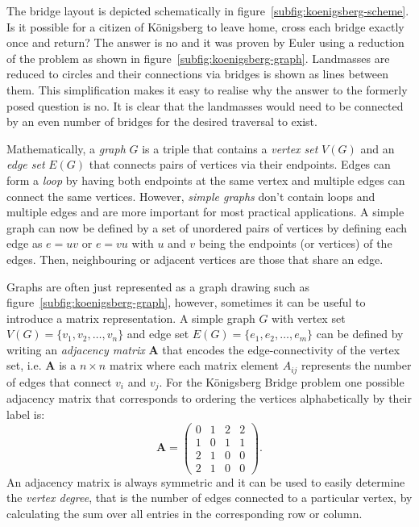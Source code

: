 %
The bridge layout is depicted schematically in
figure~\ref{subfig:koenigsberg-scheme}. Is it possible for a citizen of
K\"onigsberg to leave home, cross each bridge exactly once and return? The
answer is no and it was proven by Euler using a reduction of the problem as
shown in figure~\ref{subfig:koenigsberg-graph}. Landmasses are reduced to
circles and their connections via bridges is shown as lines between them. This
simplification makes it easy to realise why the answer to the formerly posed
question is no. It is clear that the landmasses would need to be connected by an
even number of bridges for the desired traversal to exist.

Mathematically, a \textit{graph} $G$ is a triple that contains a \textit{vertex
set} $V(G)$ and an \textit{edge set} $E(G)$ that connects pairs of vertices via
their endpoints. Edges can form a \textit{loop} by having both endpoints at the
same vertex and multiple edges can connect the same vertices. However,
\textit{simple graphs} don't contain loops and multiple edges and are more
important for most practical applications. A simple graph can now be defined by
a set of unordered pairs of vertices by defining each edge as $e=uv$ or $e=vu$
with $u$ and $v$ being the endpoints (or vertices) of the edges. Then,
neighbouring or adjacent vertices are those that share an edge.

Graphs are often just represented as a graph drawing such as
figure~\ref{subfig:koenigsberg-graph}, however, sometimes it can be useful to
introduce a matrix representation. A simple graph $G$ with vertex set
$V(G)=\{v_1,v_2,\dots,v_n\}$ and edge set $E(G)=\{e_1,e_2,\dots,e_m\}$ can be
defined by writing an \textit{adjacency matrix} $\mathbf{A}$ that encodes the
edge-connectivity of the vertex set, i.e. $\mathbf{A}$ is a $n\times n$ matrix
where each matrix element $A_{ij}$ represents the number of edges that connect
$v_i$ and $v_j$. For the K\"onigsberg Bridge problem one possible adjacency
matrix that corresponds to ordering the vertices alphabetically by their label
is:
%
\begin{equation}
    \mathbf{A}=
    \begin{pmatrix}
         0 & 1 & 2 & 2\\
         1 & 0 & 1 & 1\\
         2 & 1 & 0 & 0\\
         2 & 1 & 0 & 0
    \end{pmatrix}.
\end{equation}
%
An adjacency matrix is always symmetric and it can be used to easily determine
the \textit{vertex degree}, that is the number of edges connected to a
particular vertex, by calculating the sum over all entries in the corresponding
row or column. 

